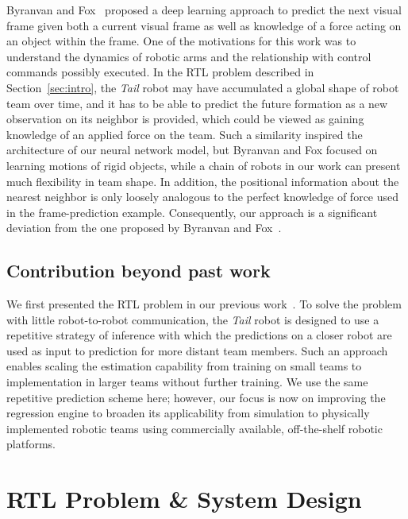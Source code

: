 \documentclass[letterpaper, 10 pt, conference]{ieeeconf}  %
\begin{document}
    Byranvan and Fox~\cite{BF17} proposed a deep learning approach to
    predict the next visual frame given both a current visual frame as
    well as knowledge of a force acting on an object within the frame.
    One of the motivations for this work was to understand the dynamics
    of robotic arms and the relationship with control commands possibly
    executed. In the RTL problem described in Section~\ref{sec:intro},
    the \emph{Tail} robot may have accumulated a global shape of robot
    team over time, and it has to be able to predict the future
    formation as a new observation on its neighbor is provided, which
    could be viewed as gaining knowledge of an applied force on the
    team. Such a similarity inspired the architecture of our neural
    network model, but Byranvan and Fox focused on learning motions of
    rigid objects, while a chain of robots in our work can present much
    flexibility in team shape. In addition, the positional information
    about the nearest neighbor is only loosely analogous to the perfect
    knowledge of force used in the frame-prediction example.
    Consequently, our approach is a significant deviation from the one
    proposed by Byranvan and Fox~\cite{BF17}.

	\subsection{Contribution beyond past work}
	\label{sec:scalable_teammate_localization}

    We first presented the RTL problem in our previous
    work~\cite{CPR17}. To solve the problem with little robot-to-robot
    communication, the \emph{Tail} robot is designed to use a repetitive
    strategy of inference with which the predictions on a closer robot
    are used as input to prediction for more distant team members. Such
    an approach enables scaling the estimation capability from training
    on small teams to implementation in larger teams without further
    training. We use the same repetitive prediction scheme here;
    however, our focus is now on improving the regression engine to
    broaden its applicability from simulation to physically implemented
    robotic teams using commercially available, off-the-shelf robotic
    platforms.

	\section{RTL Problem \& System Design}
	\label{sec:rtl_problem}
\end{document}
